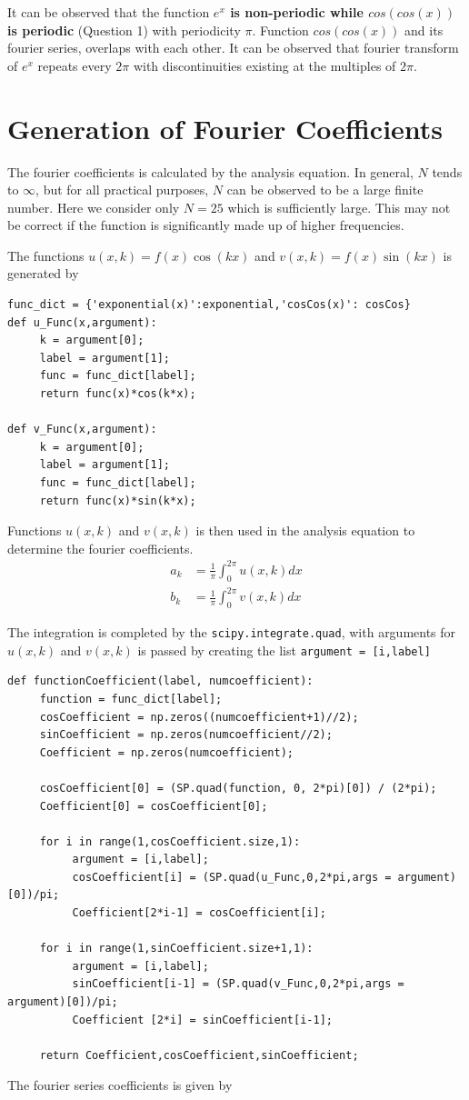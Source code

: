 \documentclass[12pt, a4paper]{report}
\begin{document}
It can be observed that the function \textbf{$e^x$ is non-periodic while $cos(cos(x))$ is periodic} (Question 1) with periodicity $\pi$. Function $cos(cos(x))$ and its fourier series, overlaps with each other. It can be observed that fourier transform of $e^x$ repeats every $2\pi$ with discontinuities existing at the multiples of $2\pi$.

\section*{Generation of Fourier Coefficients}
The fourier coefficients is calculated by the analysis equation. In general, $N$ tends to $\infty$, but for all practical purposes, $N$ can be observed to be a large finite number. Here we consider only $N = 25$ which is sufficiently large. This may not be correct if the function is significantly made up of higher frequencies.

The functions $u(x,k)=f(x)\cos(kx)$ and $v(x,k)=f(x)\sin(kx)$ is generated by
\begin{verbatim}
func_dict = {'exponential(x)':exponential,'cosCos(x)': cosCos}
def u_Func(x,argument):
     k = argument[0];
     label = argument[1];
     func = func_dict[label];
     return func(x)*cos(k*x);

def v_Func(x,argument):
     k = argument[0];
     label = argument[1];
     func = func_dict[label];
     return func(x)*sin(k*x);
\end{verbatim} 

Functions $u(x,k)$ and $v(x,k)$ is then used in the analysis equation to determine the fourier coefficients. 
 \begin{align*}
a_{k}&=\frac{1}{\pi}\int_{0}^{2\pi} u(x,k)dx\\
b_{k}&=\frac{1}{\pi}\int_{0}^{2\pi} v(x,k)dx
 \end{align*}
 
 The integration is completed by the \texttt{scipy.integrate.quad}, with arguments for $u(x,k)$ and $v(x,k)$ is passed by creating the list \texttt{argument = [i,label]}

\begin{verbatim}
def functionCoefficient(label, numcoefficient):
     function = func_dict[label];
     cosCoefficient = np.zeros((numcoefficient+1)//2);
     sinCoefficient = np.zeros(numcoefficient//2);
     Coefficient = np.zeros(numcoefficient);
     
     cosCoefficient[0] = (SP.quad(function, 0, 2*pi)[0]) / (2*pi);
     Coefficient[0] = cosCoefficient[0];
     
     for i in range(1,cosCoefficient.size,1):
          argument = [i,label];
          cosCoefficient[i] = (SP.quad(u_Func,0,2*pi,args = argument)[0])/pi;
          Coefficient[2*i-1] = cosCoefficient[i];

     for i in range(1,sinCoefficient.size+1,1):
          argument = [i,label];
          sinCoefficient[i-1] = (SP.quad(v_Func,0,2*pi,args = argument)[0])/pi;
          Coefficient [2*i] = sinCoefficient[i-1];

     return Coefficient,cosCoefficient,sinCoefficient;
\end{verbatim} 
The fourier series coefficients is given by
\end{document}

